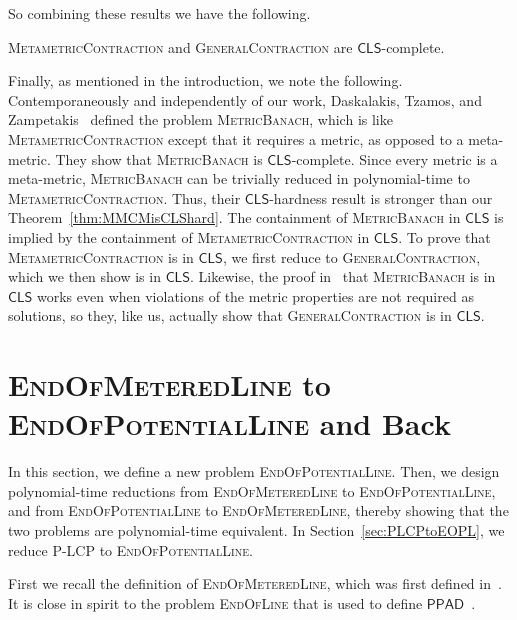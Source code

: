 \documentclass[a4paper,UKenglish]{lipics2}
\theoremstyle{definition}
\def\cc#1{\mathsf{#1}}
\def\CLS{\ensuremath{\cc{CLS}}\xspace}
\def\PPAD{\ensuremath{\cc{PPAD}}\xspace}
\def\problem#1{\textsc{#1}}
\def\GCM{\problem{GeneralContraction}\xspace}
\def\MMCM{\problem{MetametricContraction}\xspace}
\def\EOL{\problem{EndOfLine}\xspace}
\def\EOPL{\problem{EndOfPotentialLine}\xspace}
\def\EOML{\problem{EndOfMeteredLine}\xspace}
\def\PLCP{\problem{P-LCP}\xspace}
\def\MBanach{\problem{MetricBanach}\xspace}
\begin{document}
So combining these results we have the following.

\begin{theorem}
\MMCM and \GCM are \CLS-complete.
\end{theorem}

Finally, as mentioned in the introduction, we note the following.
Contemporaneously and independently of our work, Daskalakis, Tzamos, and
Zampetakis~\cite{DTZ17} defined the problem \MBanach, which is like \MMCM except
that it requires a metric, as opposed to a meta-metric.  They show that \MBanach
is \CLS-complete.  Since every metric is a meta-metric, \MBanach can be
trivially reduced in polynomial-time to \MMCM. Thus, their \CLS-hardness result
is stronger than our Theorem~\ref{thm:MMCMisCLShard}.
The
containment of \MBanach in \CLS is implied by the containment of \MMCM in \CLS. 
To prove
that \MMCM is in \CLS, we first reduce to \GCM, which we then show is in \CLS.
Likewise, the proof in~\cite{DTZ17} that \MBanach is in \CLS works even when
violations of the metric properties are not required as solutions, so they, like
us, actually show that \GCM is in \CLS.

\section{\EOML to \EOPL and Back}
\label{sec:EOMLtoEOPL}

In this section, we define a new problem \EOPL.
Then, we design polynomial-time reductions from \EOML to \EOPL, and
from \EOPL to \EOML, thereby showing that the two problems 
are polynomial-time equivalent. In Section~\ref{sec:PLCPtoEOPL},
we reduce \PLCP to \EOPL.

First we recall the definition of \EOML, which was
first defined in~\cite{hubavcek2017hardness}.
It is close in spirit to the problem \EOL that is used
to define \PPAD~\cite{papadimitriou1994complexity}. 
\end{document}
